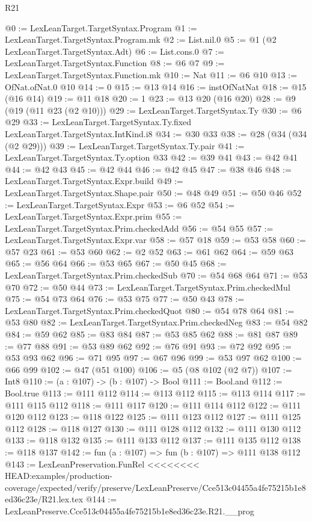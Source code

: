 \begin{lexlean}{R21}
\begin{coremodule}
{{{{{@0 := LexLeanTarget.TargetSyntax.Program
@1 := LexLeanTarget.TargetSyntax.Program.mk
@2 := List.nil.{0}
@5 := @1 (@2 LexLeanTarget.TargetSyntax.Adt)
@6 := List.cons.{0}
@7 := LexLeanTarget.TargetSyntax.Function
@8 := @6 @7
@9 := LexLeanTarget.TargetSyntax.Function.mk
@10 := Nat
@11 := @6 @10
@13 := OfNat.ofNat.{0} @10
@14 := 0
@15 := @13 @14
@16 := instOfNatNat
@18 := @15 (@16 @14)
@19 := @11 @18
@20 := 1
@23 := @13 @20 (@16 @20)
@28 := @9 (@19 (@11 @23 (@2 @10)))
@29 := LexLeanTarget.TargetSyntax.Ty
@30 := @6 @29
@33 := LexLeanTarget.TargetSyntax.Ty.fixed LexLeanTarget.TargetSyntax.IntKind.i8
@34 := @30 @33
@38 := @28 (@34 (@34 (@2 @29)))
@39 := LexLeanTarget.TargetSyntax.Ty.pair
@41 := LexLeanTarget.TargetSyntax.Ty.option @33
@42 := @39 @41
@43 := @42 @41
@44 := @42 @43
@45 := @42 @44
@46 := @42 @45
@47 := @38 @46
@48 := LexLeanTarget.TargetSyntax.Expr.build
@49 := LexLeanTarget.TargetSyntax.Shape.pair
@50 := @48 @49
@51 := @50 @46
@52 := LexLeanTarget.TargetSyntax.Expr
@53 := @6 @52
@54 := LexLeanTarget.TargetSyntax.Expr.prim
@55 := LexLeanTarget.TargetSyntax.Prim.checkedAdd
@56 := @54 @55
@57 := LexLeanTarget.TargetSyntax.Expr.var
@58 := @57 @18
@59 := @53 @58
@60 := @57 @23
@61 := @53 @60
@62 := @2 @52
@63 := @61 @62
@64 := @59 @63
@65 := @56 @64
@66 := @53 @65
@67 := @50 @45
@68 := LexLeanTarget.TargetSyntax.Prim.checkedSub
@70 := @54 @68 @64
@71 := @53 @70
@72 := @50 @44
@73 := LexLeanTarget.TargetSyntax.Prim.checkedMul
@75 := @54 @73 @64
@76 := @53 @75
@77 := @50 @43
@78 := LexLeanTarget.TargetSyntax.Prim.checkedQuot
@80 := @54 @78 @64
@81 := @53 @80
@82 := LexLeanTarget.TargetSyntax.Prim.checkedNeg
@83 := @54 @82
@84 := @59 @62
@85 := @83 @84
@87 := @53 @85 @62
@88 := @81 @87
@89 := @77 @88
@91 := @53 @89 @62
@92 := @76 @91
@93 := @72 @92
@95 := @53 @93 @62
@96 := @71 @95
@97 := @67 @96
@99 := @53 @97 @62
@100 := @66 @99
@102 := @47 (@51 @100)
@106 := @5 (@8 @102 (@2 @7))
@107 := Int8
@110 := (a : @107) -> (b : @107) -> Bool
@111 := Bool.and
@112 := Bool.true
@113 := @111 @112
@114 := @113 @112
@115 := @113 @114
@117 := @111 @115 @112
@118 := @111 @117
@120 := @111 @114 @112
@122 := @111 @120 @112
@123 := @118 @122
@125 := @111 @123 @112
@127 := @111 @125 @112
@128 := @118 @127
@130 := @111 @128 @112
@132 := @111 @130 @112
@133 := @118 @132
@135 := @111 @133 @112
@137 := @111 @135 @112
@138 := @118 @137
@142 := fun (a : @107) => fun (b : @107) => @111 @138 @112
@143 := LexLeanPreservation.FunRel
<<<<<<<< HEAD:examples/production-coverage/expected/verify/preserve/LexLeanPreserve/Cce513c04455a4fe75215b1e8ed36c23e/R21.lex.tex
@144 := LexLeanPreserve.Cce513c04455a4fe75215b1e8ed36c23e.R21.__prog
}}}}}
\end{coremodule}
\end{lexlean}
